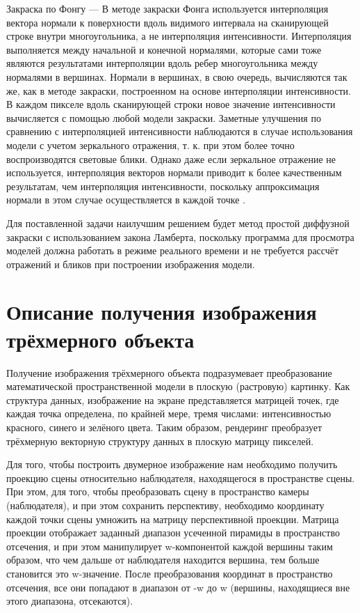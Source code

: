 Закраска по Фонгу — В методе закраски Фонга используется интерполяция вектора нормали к поверхности вдоль видимого интервала на сканирующей строке внутри многоугольника, а не интерполяция интенсивности. Интерполяция выполняется между начальной и конечной нормалями, которые сами тоже являются результатами интерполяции вдоль ребер многоугольника между нормалями в вершинах. Нормали в вершинах, в свою очередь, вычисляются так же, как в методе закраски, построенном на основе интерполяции интенсивности. В каждом пикселе вдоль сканирующей строки новое значение интенсивности вычисляется с помощью любой модели закраски. Заметные улучшения по сравнению с интерполяцией интенсивности наблюдаются в случае использования модели с учетом зеркального отражения, т. к. при этом более точно воспроизводятся световые блики. Однако даже если зеркальное отражение не используется, интерполяция векторов нормали приводит к более качественным результатам, чем интерполяция интенсивности, поскольку аппроксимация нормали в этом случае осуществляется в каждой точке \cite{belcg}.

Для поставленной задачи наилучшим решением будет метод простой диффузной закраски с использованием закона Ламберта, поскольку программа для просмотра моделей должна работать в режиме реального времени и не требуется рассчёт отражений и бликов при построении изображения модели.

\section{Описание получения изображения трёхмерного объекта}
Получение изображения трёхмерного объекта подразумевает преобразование математической пространственной модели в плоскую (растровую) картинку. Как структура данных, изображение на экране представляется матрицей точек, где каждая точка определена, по крайней мере, тремя числами: интенсивностью красного, синего и зелёного цвета. Таким образом, рендеринг преобразует трёхмерную векторную структуру данных в плоскую матрицу пикселей. 

Для того, чтобы построить двумерное изображение нам необходимо получить проекцию сцены относительно наблюдателя, находящегося в пространстве сцены. При этом, для того, чтобы преобразовать сцену в пространство камеры (наблюдателя), и при этом сохранить перспективу, необходимо координату каждой точки сцены умножить на матрицу перспективной проекции. Матрица проекции отображает заданный диапазон усеченной пирамиды в пространство отсечения, и при этом манипулирует w-компонентой каждой вершины таким образом, что чем дальше от наблюдателя находится вершина, тем больше становится это w-значение. После преобразования координат в пространство отсечения, все они попадают в диапазон от -w до w (вершины, находящиеся вне этого диапазона, отсекаются).

